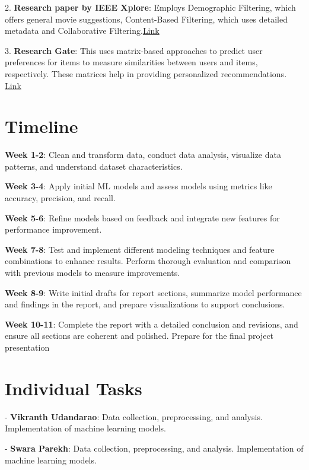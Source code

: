 \documentclass[10pt,twocolumn,letterpaper]{article}
\begin{document}
2. \textbf{Research paper by IEEE Xplore}: Employs Demographic Filtering, which offers general movie suggestions, Content-Based Filtering, which uses detailed metadata and Collaborative Filtering.\textcolor{blue}{\href{https://ieeexplore.ieee.org/document/9985512}{Link}}

3. \textbf{Research Gate}: This uses matrix-based approaches to predict user preferences for items to measure similarities between users and items, respectively. These matrices help in providing personalized recommendations.
\textcolor{blue}{\href{https://www.researchgate.net/publication/341876202_Machine_Learning_Model_for_Movie_Recommendation_System}{Link}}

\section{Timeline}
\textbf{Week 1-2}: Clean and transform data, conduct data analysis, visualize data patterns, and understand dataset characteristics.

\textbf{Week 3-4}:  Apply initial ML models and assess models using metrics like accuracy, precision, and recall.

\textbf{Week 5-6}: Refine models based on feedback and integrate new features for performance improvement.

\textbf{Week 7-8}: Test and implement different modeling techniques and feature combinations to enhance results. Perform thorough evaluation and comparison with previous models to measure improvements.

\textbf{Week 8-9}: Write initial drafts for report sections, summarize model performance and findings in the report, and prepare visualizations to support conclusions.

\textbf{Week 10-11}: Complete the report with a detailed conclusion and revisions, and ensure all sections are coherent and polished. Prepare for the final project presentation

\section{Individual Tasks}
- \textbf{Vikranth Udandarao}: Data collection, preprocessing, and analysis. Implementation of machine learning models.

- \textbf{Swara Parekh}: Data collection, preprocessing, and analysis. Implementation of machine learning models.
\end{document}
